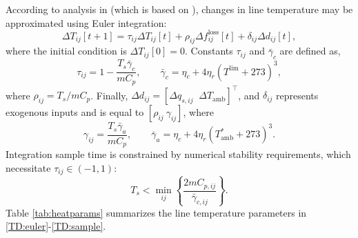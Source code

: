 \documentclass[conference]{IEEEtran}
\begin{document}
According to analysis in \cite{almassalkhi2014} (which is based on
\cite{ieee2007}), changes in line temperature may be approximated
using Euler integration:
\begin{equation}
\label{TD:euler}
\Delta T_{ij}[t+1] = \tau_{ij}\Delta T_{ij}[t] + \rho_{ij}\Delta
f_{ij}^\text{loss}[t] + \delta_{ij}\Delta d_{ij}[t],
\end{equation}
where the initial condition is $\Delta T_{ij}[0] = 0$. Constants
$\tau_{ij}$ and $\bar{\gamma}_c$ are defined as,
\begin{equation}
\tau_{ij} = 1 - \frac{T_s\bar{\gamma}_c}{mC_p},\qquad \bar{\gamma}_c =
\eta_c + 4\eta_r(T^\text{lim} + 273)^3,
\end{equation}
where $\rho_{ij} = T_s/mC_p$. Finally, $\Delta d_{ij} = [\Delta
  q_{s,ij} \;\; \Delta T_\text{amb}]^\top$, and $\delta_{ij}$ represents
exogenous inputs and is equal to $[\rho_{ij}~\gamma_{ij}]$, where
\begin{equation}
\gamma_{ij} = \frac{T_s\bar{\gamma}_a}{mC_p}, \qquad \bar{\gamma}_a =
\eta_c + 4\eta_r(T_\text{amb}^* + 273)^3.
\end{equation}
Integration sample time is constrained by numerical stability
requirements, which necessitate $\tau_{ij}\in(-1,1)$:
\begin{equation}
\label{TD:sample}
T_s < \min_{ij}\left\lbrace \frac{2mC_{p,ij}}{\bar{\gamma}_{c,ij}}\right\rbrace.
\end{equation}
Table \ref{tab:heatparams} summarizes the line temperature parameters in \eqref{TD:euler}-\eqref{TD:sample}.
\end{document}
